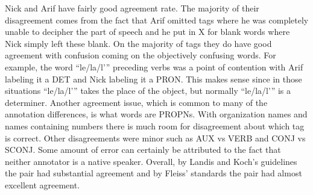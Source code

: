 \documentclass{article}\usepackage[]{graphicx}\usepackage[]{color}
\begin{document}
Nick and Arif have fairly good agreement rate. The majority of their disagreement comes from the fact that Arif omitted tags where he was completely unable to decipher the part of speech and he put in X for blank words where Nick simply left these blank. On the majority of tags they do have good agreement with confusion coming on the objectively confusing words. For example, the word “le/la/l’” preceding verbs was a point of contention with Arif labeling it a DET and Nick labeling it a PRON. This makes sense since in those situations “le/la/l’” takes the place of the object, but normally “le/la/l’” is a determiner. Another agreement issue, which is common to many of the annotation differences, is what words are PROPNs. With organization names and names containing numbers there is much room for disagreement about which tag is correct. Other disagreements were minor such as AUX vs VERB and CONJ vs SCONJ. Some amount of error can certainly be attributed to the fact that neither annotator is a native speaker. Overall, by Landis and Koch’s guidelines the pair had substantial agreement and by Fleiss’ standards the pair had almost excellent agreement.
\end{document}
